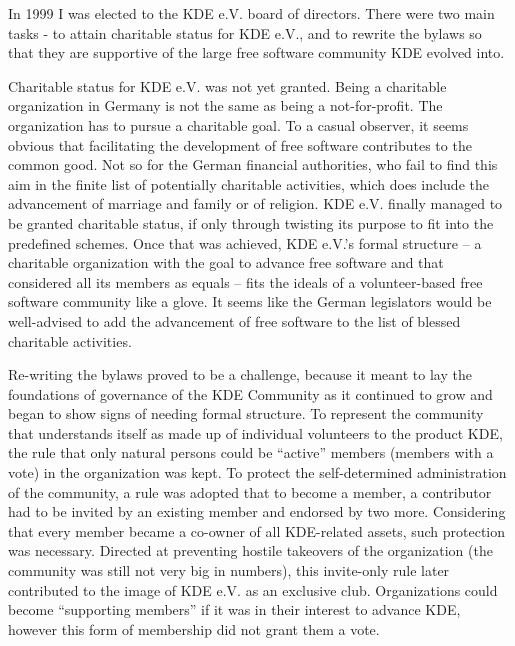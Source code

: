 In 1999 I was elected to the KDE e.V. board of directors. There were
two main tasks - to attain charitable status for KDE
e.V., and to rewrite the bylaws so that they are supportive of
the large free software community KDE evolved into.

Charitable status for KDE e.V. was not yet granted. Being a charitable
organization in Germany is not the same as being a not-for-profit. The
organization has to pursue a charitable goal. To a
casual observer, it seems obvious that facilitating the development of
free software contributes to the common good. Not so for the German
financial authorities, who fail to find this aim in the finite
list of potentially charitable activities, which does include the
advancement of marriage and family or of religion. KDE e.V. finally
managed to be granted charitable status, if only through twisting its
purpose to fit into the predefined schemes. Once that was achieved,
KDE e.V.'s formal structure -- a charitable organization with the goal
to advance free software and that considered all its members as
equals -- fits the ideals of a volunteer-based free software community
like a glove. It seems like the
German legislators would be well-advised to add the advancement of
free software to the list of blessed charitable activities.

Re-writing the bylaws proved to be a challenge, because it meant to
lay the foundations of governance of the KDE Community as it continued
to grow and began to show signs of needing formal structure.
To represent the community that understands itself as made up of
individual volunteers to the product KDE, the rule that only natural
persons could be ``active'' members (members with a vote) in the
organization was kept. To protect the self-determined administration of
the community, a rule was adopted that to become a member, a
contributor had to be invited by an existing member and endorsed by
two more. Considering that every member became a co-owner of all
KDE-related assets, such protection was necessary. Directed at
preventing hostile takeovers of the organization 
(the community was still not very big in numbers), this invite-only
rule later contributed to the image of KDE e.V. as an exclusive
club. Organizations could become ``supporting members'' if it was in
their interest to advance KDE, however this form of membership did not
grant them a vote.

